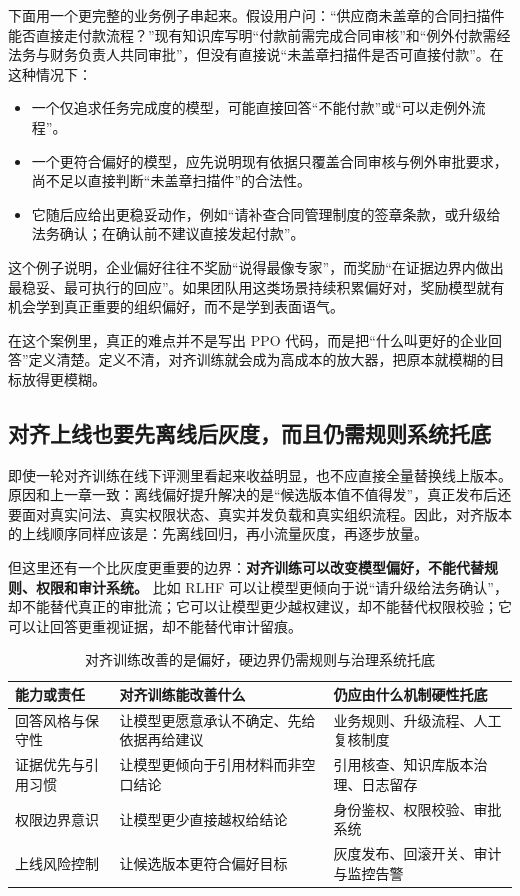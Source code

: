 下面用一个更完整的业务例子串起来。假设用户问：“供应商未盖章的合同扫描件能否直接走付款流程？”现有知识库写明“付款前需完成合同审核”和“例外付款需经法务与财务负责人共同审批”，但没有直接说“未盖章扫描件是否可直接付款”。在这种情况下：
\begin{itemize}
  \item 一个仅追求任务完成度的模型，可能直接回答“不能付款”或“可以走例外流程”。
  \item 一个更符合偏好的模型，应先说明现有依据只覆盖合同审核与例外审批要求，尚不足以直接判断“未盖章扫描件”的合法性。
  \item 它随后应给出更稳妥动作，例如“请补查合同管理制度的签章条款，或升级给法务确认；在确认前不建议直接发起付款”。
\end{itemize}

这个例子说明，企业偏好往往不奖励“说得最像专家”，而奖励“在证据边界内做出最稳妥、最可执行的回应”。如果团队用这类场景持续积累偏好对，奖励模型就有机会学到真正重要的组织偏好，而不是学到表面语气。

在这个案例里，真正的难点并不是写出 PPO 代码，而是把“什么叫更好的企业回答”定义清楚。定义不清，对齐训练就会成为高成本的放大器，把原本就模糊的目标放得更模糊。

\subsection{对齐上线也要先离线后灰度，而且仍需规则系统托底}
即使一轮对齐训练在线下评测里看起来收益明显，也不应直接全量替换线上版本。原因和上一章一致：离线偏好提升解决的是“候选版本值不值得发”，真正发布后还要面对真实问法、真实权限状态、真实并发负载和真实组织流程。因此，对齐版本的上线顺序同样应该是：先离线回归，再小流量灰度，再逐步放量。

但这里还有一个比灰度更重要的边界：\textbf{对齐训练可以改变模型偏好，不能代替规则、权限和审计系统。} 比如 RLHF 可以让模型更倾向于说“请升级给法务确认”，却不能替代真正的审批流；它可以让模型更少越权建议，却不能替代权限校验；它可以让回答更重视证据，却不能替代审计留痕。

\begin{table}[H]
\centering
\small
\begin{tabularx}{\textwidth}{>{\raggedright\arraybackslash}p{2.8cm}>{\raggedright\arraybackslash}p{3.1cm}>{\raggedright\arraybackslash}X}
\toprule
\textbf{能力或责任} & \textbf{对齐训练能改善什么} & \textbf{仍应由什么机制硬性托底} \\
\midrule
回答风格与保守性 & 让模型更愿意承认不确定、先给依据再给建议 & 业务规则、升级流程、人工复核制度 \\
证据优先与引用习惯 & 让模型更倾向于引用材料而非空口结论 & 引用核查、知识库版本治理、日志留存 \\
权限边界意识 & 让模型更少直接越权给结论 & 身份鉴权、权限校验、审批系统 \\
上线风险控制 & 让候选版本更符合偏好目标 & 灰度发布、回滚开关、审计与监控告警 \\
\bottomrule
\end{tabularx}
\caption{对齐训练改善的是偏好，硬边界仍需规则与治理系统托底}
\label{tab:alignment-vs-governance}
\end{table}

